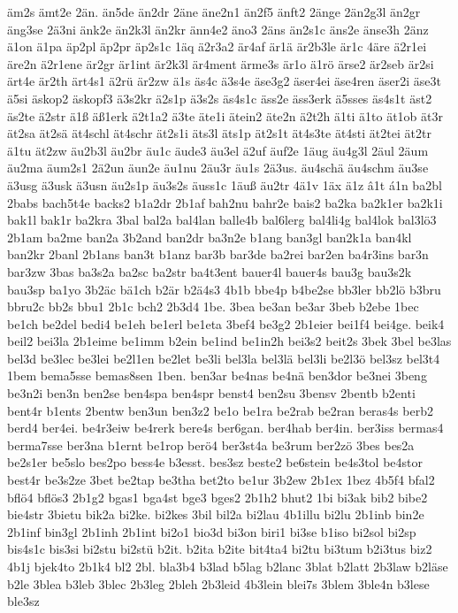 {äm2s
ämt2e
2än.
än5de
än2dr
2äne
äne2n1
än2f5
änft2
2änge
2än2g3l
än2gr
äng3se
2ä3ni
änk2e
än2k3l
än2kr
änn4e2
äno3
2äns
än2s1c
äns2e
änse3h
2änz
ä1on
ä1pa
äp2pl
äp2pr
äp2s1c
1äq
ä2r3a2
är4af
är1ä
är2b3le
är1c
4äre
ä2r1ei
äre2n
ä2r1ene
är2gr
är1int
är2k3l
är4ment
ärme3s
är1o
ä1rö
ärse2
är2seb
är2si
ärt4e
är2th
ärt4s1
ä2rü
är2zw
ä1s
äs4c
ä3s4e
äse3g2
äser4ei
äse4ren
äser2i
äse3t
ä5si
äskop2
äskopf3
ä3s2kr
ä2s1p
ä3s2s
äs4s1c
äss2e
äss3erk
ä5sses
äs4s1t
äst2
äs2te
ä2str
ä1ß
äß1erk
ä2t1a2
ä3te
äte1i
ätein2
äte2n
ä2t2h
ä1ti
ä1to
ät1ob
ät3r
ät2sa
ät2sä
ät4schl
ät4schr
ät2s1i
äts3l
äts1p
ät2s1t
ät4s3te
ät4sti
ät2tei
ät2tr
ä1tu
ät2zw
äu2b3l
äu2br
äu1c
äude3
äu3el
ä2uf
äuf2e
1äug
äu4g3l
2äul
2äum
äu2ma
äum2s1
2ä2un
äun2e
äu1nu
2äu3r
äu1s
2ä3us.
äu4schä
äu4schm
äu3se
ä3usg
ä3usk
ä3usn
äu2s1p
äu3s2s
äuss1c
1äuß
äu2tr
4ä1v
1äx
ä1z
â1t
á1n
ba2bl
2babs
bach5t4e
backs2
b1a2dr
2b1af
bah2nu
bahr2e
bais2
ba2ka
ba2k1er
ba2k1i
bak1l
bak1r
ba2kra
3bal
bal2a
bal4lan
balle4b
bal6lerg
bal4li4g
bal4lok
bal3lö3
2b1am
ba2me
ban2a
3b2and
ban2dr
ba3n2e
b1ang
ban3gl
ban2k1a
ban4kl
ban2kr
2banl
2b1ans
ban3t
b1anz
bar3b
bar3de
ba2rei
bar2en
ba4r3ins
bar3n
bar3zw
3bas
ba3s2a
ba2sc
ba2str
ba4t3ent
bauer4l
bauer4s
bau3g
bau3s2k
bau3sp
ba1yo
3b2äc
bä1ch
b2är
b2ä4s3
4b1b
bbe4p
b4be2se
bb3ler
bb2lö
b3bru
bbru2c
bb2s
bbu1
2b1c
bch2
2b3d4
1be.
3bea
be3an
be3ar
3beb
b2ebe
1bec
be1ch
be2del
bedi4
be1eh
be1erl
be1eta
3bef4
be3g2
2b1eier
bei1f4
bei4ge.
beik4
beil2
bei3la
2b1eime
be1imm
b2ein
be1ind
be1in2h
bei3s2
beit2s
3bek
3bel
be3las
bel3d
be3lec
be3lei
be2l1en
be2let
be3li
bel3la
bel3lä
bel3li
be2l3ö
bel3sz
bel3t4
1bem
bema5sse
bemas8sen
1ben.
ben3ar
be4nas
be4nä
ben3dor
be3nei
3beng
be3n2i
ben3n
ben2se
ben4spa
ben4spr
benst4
ben2su
3bensv
2bentb
b2enti
bent4r
b1ents
2bentw
ben3un
ben3z2
be1o
be1ra
be2rab
be2ran
beras4s
berb2
berd4
ber4ei.
be4r3eiw
be4rerk
bere4s
ber6gan.
ber4hab
ber4in.
ber3iss
bermas4
berma7sse
ber3na
b1ernt
be1rop
berö4
ber3st4a
be3rum
ber2zö
3bes
bes2a
be2s1er
be5slo
bes2po
bess4e
b3esst.
bes3sz
beste2
be6stein
be4s3tol
be4stor
best4r
be3s2ze
3bet
be2tap
be3tha
bet2to
be1ur
3b2ew
2b1ex
1bez
4b5f4
bfal2
bflö4
bflös3
2b1g2
bgas1
bga4st
bge3
bges2
2b1h2
bhut2
1bi
bi3ak
bib2
bibe2
bie4str
3bietu
bik2a
bi2ke.
bi2kes
3bil
bil2a
bi2lau
4b1illu
bi2lu
2b1inb
bin2e
2b1inf
bin3gl
2b1inh
2b1int
bi2o1
bio3d
bi3on
biri1
bi3se
b1iso
bi2sol
bi2sp
bis4s1c
bis3si
bi2stu
bi2stü
b2it.
b2ita
b2ite
bit4ta4
bi2tu
bi3tum
b2i3tus
biz2
4b1j
bjek4to
2b1k4
bl2
2bl.
bla3b4
b3lad
b5lag
b2lanc
3blat
b2latt
2b3law
b2läse
b2le
3blea
b3leb
3blec
2b3leg
2bleh
2b3leid
4b3lein
blei7s
3blem
3ble4n
b3lese
ble3sz
}
